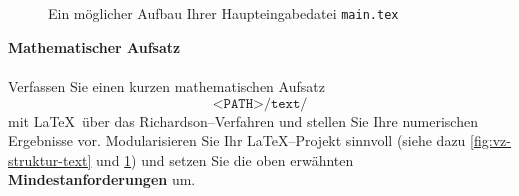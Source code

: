 \begin{figure}[h!]
	\hspace*{0.5cm}\\
	\hspace*{0.5cm}\\
	\hspace*{0.5cm}\\
	\hspace*{0.5cm}\\
	~\\
	\hspace*{0.5cm}\\
	\hspace*{0.5cm}\\
	\hspace*{0.5cm}\\
	\hspace*{0.5cm}\\
	\hspace*{0.5cm}\\
	~\\
	\hspace*{0.5cm}\\
	\hspace*{0.5cm}\\
	\hspace*{0.5cm}\\
	\hspace*{0.5cm}\\
	\hspace*{0.5cm}\ttt{\color{gray} \% }\\
	\hspace*{0.5cm} \\
	\caption{Ein möglicher Aufbau Ihrer Haupteingabedatei \texttt{main.tex}}
	\label{fig:main.tex}
\end{figure}


	
	\textbf{Mathematischer Aufsatz }\\
	~\\Verfassen Sie einen kurzen mathematischen Aufsatz 
	$$	 \texttt{<PATH>/text/} $$
	mit \LaTeX~über das Richardson--Verfahren und stellen Sie Ihre numerischen Ergebnisse vor. Modularisieren Sie Ihr \LaTeX--Projekt sinnvoll (siehe dazu \ref{fig:vz-struktur-text} und \ref{fig:main.tex}) und setzen Sie die oben erwähnten \textbf{Mindestanforderungen} um. \\	
	
